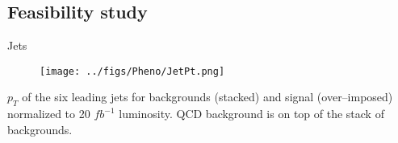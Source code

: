 \subsection{Feasibility study}

\begin{frame}{Jets \pt}
\vspace{-.4cm}
\begin{figure}[!Hhtbp]
  \begin{center}
    \texttt{[image: ../figs/Pheno/JetPt.png]}
  \end{center}
\end{figure}
\vspace{-.4cm}
    \begin{block}{}
      \tiny \centering $p_{T}$  of the six leading jets for backgrounds (stacked) and signal (over--imposed) normalized to 20 $fb^{-1}$ luminosity. QCD background is on top of the stack of backgrounds.
    \end{block}

\end{frame}

